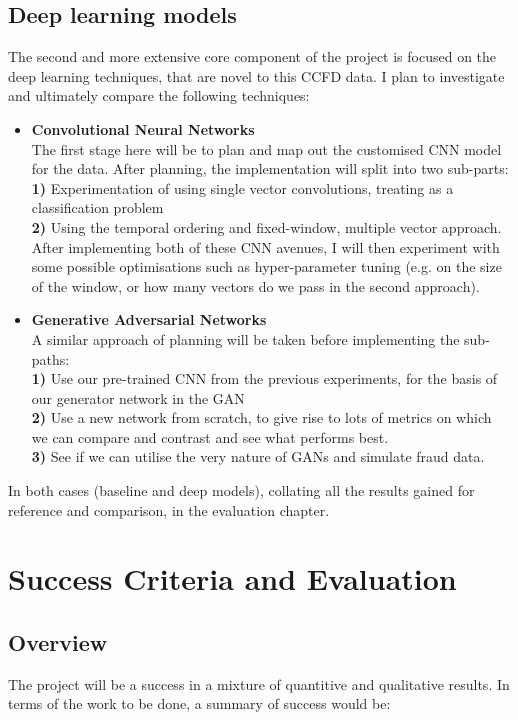 \documentclass[12pt,a4paper,twoside]{article}
\begin{document}
\subsection*{Deep learning models}
The second and more extensive core component of the project is focused on the deep learning techniques, that are novel to this CCFD data. I plan to investigate and ultimately compare the following techniques:
\begin{itemize}
\item
	\textbf{Convolutional Neural Networks} \cite{DBLP:journals/corr/SimonyanZ14a} \\
	The first stage here will be to plan and map out the customised CNN model for the data. After planning, the implementation will split into two sub-parts: \\
    	\textbf{1)} Experimentation of using single vector convolutions, treating as a classification problem\\ \textbf{2)} Using the temporal ordering and fixed-window, multiple vector approach. \\ After implementing both of these CNN avenues, I will then experiment with some possible optimisations such as hyper-parameter tuning (e.g. on the size of the window, or how many vectors do we pass in the second approach).
\item
	\textbf{Generative Adversarial Networks  }\cite{2014arXiv1406.2661G}\\
	A similar approach of planning will be taken before implementing the sub-paths: \\ \textbf{1)} Use our pre-trained CNN from the previous experiments, for the basis of our generator network in the GAN \\ \textbf{2)} Use a new network from scratch, to give rise to lots of metrics on which we can compare and contrast and see what performs best. \\ \textbf{3)} See if we can utilise the very nature of GANs and simulate fraud data.
\end{itemize}

In both cases (baseline and deep models), collating all the results gained for reference and comparison, in the evaluation chapter.

\pagebreak
\section*{Success Criteria and Evaluation}

\subsection*{Overview}
The project will be a success in a mixture of quantitive and qualitative results. In terms of the work to be done, a summary of success would be:
\end{document}
